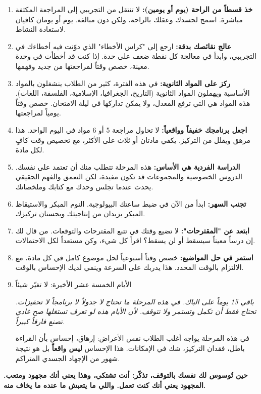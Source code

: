 \documentclass[12pt,a4paper]{book}
\newcommand{\quoteAr}[1]{%
	\begin{myquote}
		\itshape #1
	\end{myquote}
}
\newcommand{\importantAr}[1]{%
	\begin{important}
		\bfseries #1
	\end{important}
}
\begin{document}
	\begin{enumerate}
		\item \textbf{خذ قسطاً من الراحة (يوم أو يومين):} لا تنتقل من التجريبي إلى المراجعة المكثفة مباشرة. اسمح لجسدك وعقلك بالراحة، ولكن دون مبالغة. يوم أو يومان كافيان لاستعادة النشاط.
		\item \textbf{عالج نقائصك بدقة:} ارجع إلى "كراس الأخطاء" الذي دوّنت فيه أخطاءك في التجريبي، وابدأ في معالجة كل نقطة ضعف على حدة. إذا كنت قد أخطأت في وحدة معينة، خصص وقتاً لمراجعتها من جديد وفهمها.
		\item \textbf{ركز على المواد الثانوية:} في هذه الفترة، كثير من الطلاب ينشغلون بالمواد الأساسية ويهملون المواد الثانوية (التاريخ، الجغرافيا، الإسلامية، الفلسفة، اللغات). هذه المواد هي التي ترفع المعدل، ولا يمكن تداركها في ليلة الامتحان. خصص وقتاً يومياً لمراجعتها.
		\item \textbf{اجعل برنامجك خفيفاً وواقعياً:} لا تحاول مراجعة 5 أو 6 مواد في اليوم الواحد. هذا مرهق ويقلل من التركيز. يكفي مادتان أو ثلاث على الأكثر، مع تخصيص وقت كافٍ لكل مادة.
		\item \textbf{الدراسة الفردية هي الأساس:} هذه المرحلة تتطلب منك أن تعتمد على نفسك. الدروس الخصوصية والمجموعات قد تكون مفيدة، لكن التعمق والفهم الحقيقي يحدث عندما تجلس وحدك مع كتابك وملخصاتك.
		\item \textbf{تجنب السهر:} ابدأ من الآن في ضبط ساعتك البيولوجية. النوم المبكر والاستيقاظ المبكر يزيدان من إنتاجيتك ويحسنان تركيزك.
		\item \textbf{ابتعد عن "المقترحات":} لا تضيع وقتك في تتبع المقترحات والتوقعات. من قال لك إن درساً معيناً سيسقط أو لن يسقط؟ اقرأ كل شيء، وكن مستعداً لكل الاحتمالات.
		\item \textbf{استمر في حل المواضيع:} خصص وقتاً أسبوعياً لحل موضوع كامل في كل مادة، مع الالتزام بالوقت المحدد. هذا يدربك على السرعة وينمي لديك الإحساس بالوقت.

	
	
	\item الأيام الخمسة عشر الأخيرة: لا تغيّر شيئاً
	
	\quoteAr{باقي 15 يوماً على الباك. في هذه المرحلة ما تحتاج لا جدولاً لا برنامجاً لا تحفيزات. تحتاج فقط أن تكمل وتستمر ولا تتوقف. لأن الأيام هذه لو تعرف تستغلها صح غادي تصنع فارقاً كبيراً.}
	
	في هذه المرحلة يواجه أغلب الطلاب نفس الأعراض: إرهاق، إحساس بأن القراءة باطل، فقدان التركيز، شك في الإمكانات. هذا الإحساس \textbf{ليس واقعاً} بل هو نتيجة شهور من الإجهاد الجسدي المتراكم.
		\end{enumerate}
	
	\importantAr{حين تُوسوس لك نفسك بالتوقف، تذكّر: أنت تشتكي، وهذا يعني أنك مجهود ومتعب. المجهود يعني أنك كنت تعمل. واللي ما يتعبش ما عنده ما يخاف منه.}
	
\end{document}
